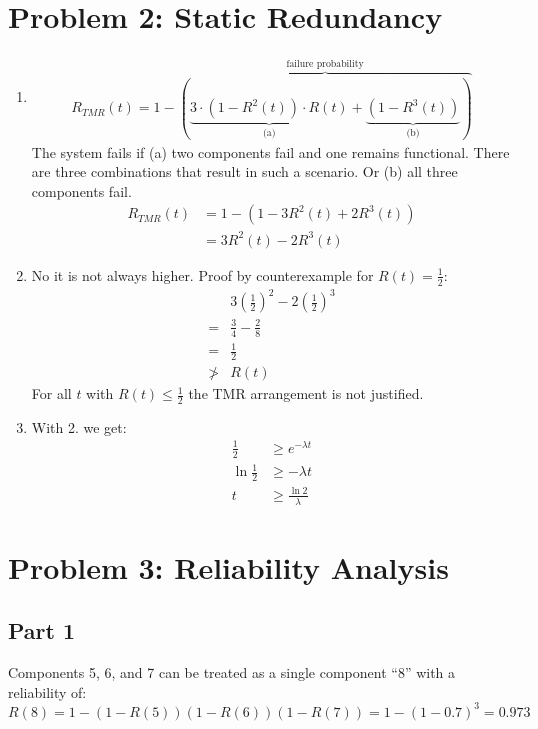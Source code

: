 \documentclass[a4paper,parskip,headheight=38pt]{scrartcl} %
\begin{document}
\section*{Problem 2: Static Redundancy}
\begin{enumerate}
\item \begin{align*}
R_{TMR}(t) = 1 - \overbrace{\left( \underbrace{3 \cdot (1 - R^2(t)) \cdot R(t)}_{\text{(a)}} + \underbrace{(1 - R^3(t))}_{\text{(b)}} \right)}^{\text{failure probability}}
\end{align*}
The system fails if (a) two components fail and one remains functional. There are three combinations that result in such a scenario. Or (b) all three components fail.
\begin{align*}
R_{TMR}(t) &= 1 - (1 - 3R^2(t) + 2R^3(t)) \\
&= 3 R^2(t) - 2 R^3(t)
\end{align*}
\item
No it is not always higher. Proof by counterexample for $R(t) = \frac{1}{2}$:
\begin{align*}
& 3\left(\frac{1}{2}\right)^2 - 2\left(\frac{1}{2}\right)^3 \\
=& \frac{3}{4} - \frac{2}{8} \\
=& \frac{1}{2} \\
\not >& R(t)
\end{align*}
For all $t$ with $R(t) \leq \frac{1}{2}$ the TMR arrangement is not justified.
\item With 2. we get:
\begin{align*}
\frac{1}{2} &\geq e^{-\lambda t} \\
\ln \frac{1}{2} &\geq -\lambda t \\
t &\geq \frac{\ln 2}{\lambda}
\end{align*}
\end{enumerate}


\section*{Problem 3: Reliability Analysis}

\subsection*{Part 1}

Components 5, 6, and 7 can be treated as a single component \enquote{8} with a reliability of:
\[R(8) = 1 - (1 - R(5))(1 - R(6))(1 - R(7)) = 1 - (1-0.7)^3 = 0.973\]
\end{document}
